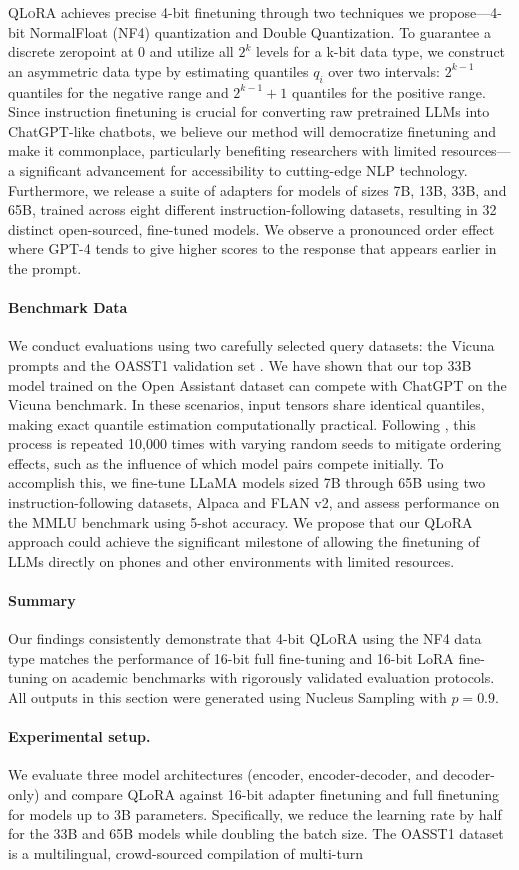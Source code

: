 {{\textsc{QLoRA} achieves precise 4-bit finetuning through two techniques we propose—4-bit NormalFloat (NF4) quantization and Double Quantization. To guarantee a discrete zeropoint at $0$ and utilize all $2^k$ levels for a k-bit data type, we construct an asymmetric data type by estimating quantiles $q_i$ over two intervals: $2^{k-1}$ quantiles for the negative range and $2^{k-1}+1$ quantiles for the positive range. Since instruction finetuning is crucial for converting raw pretrained LLMs into ChatGPT-like chatbots, we believe our method will democratize finetuning and make it commonplace, particularly benefiting researchers with limited resources—a significant advancement for accessibility to cutting-edge NLP technology. Furthermore, we release a suite of adapters for models of sizes 7B, 13B, 33B, and 65B, trained across eight different instruction-following datasets, resulting in 32 distinct open-sourced, fine-tuned models. We observe a pronounced order effect where GPT-4 tends to give higher scores to the response that appears earlier in the prompt. \paragraph{Benchmark Data} We conduct evaluations using two carefully selected query datasets: the Vicuna prompts \citep{vicuna2023} and the OASST1 validation set \citep{kopf2023openassistant}. We have shown that our top 33B model trained on the Open Assistant dataset can compete with ChatGPT on the Vicuna benchmark. In these scenarios, input tensors share identical quantiles, making exact quantile estimation computationally practical. Following \citet{vicuna2023}, this process is repeated 10,000 times with varying random seeds to mitigate ordering effects, such as the influence of which model pairs compete initially. To accomplish this, we fine-tune LLaMA models sized 7B through 65B using two instruction-following datasets, Alpaca and FLAN v2, and assess performance on the MMLU benchmark using 5-shot accuracy. We propose that our \textsc{QLoRA} approach could achieve the significant milestone of allowing the finetuning of LLMs directly on phones and other environments with limited resources. \paragraph{Summary} Our findings consistently demonstrate that 4-bit \textsc{QLoRA} using the NF4 data type matches the performance of 16-bit full fine-tuning and 16-bit LoRA fine-tuning on academic benchmarks with rigorously validated evaluation protocols. All outputs in this section were generated using Nucleus Sampling \cite{holtzmancurious} with $p=0.9$. \paragraph{Experimental setup.} We evaluate three model architectures (encoder, encoder-decoder, and decoder-only) and compare QLoRA against 16-bit adapter finetuning and full finetuning for models up to 3B parameters. Specifically, we reduce the learning rate by half for the 33B and 65B models while doubling the batch size. The OASST1 dataset is a multilingual, crowd-sourced compilation of multi-turn }}
